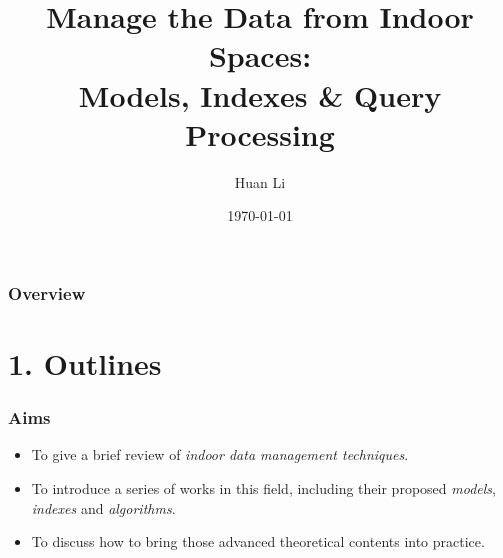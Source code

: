 \documentclass{beamer}
\title[Manage the Data from Indoor Spaces]{Manage the Data from Indoor Spaces: \\Models, Indexes \& Query Processing} %
\author{Huan Li} %
\institute[Zhejiang University] %
{
Database Laboratory, Zhejiang University \\ %
\medskip
\textit{lihuancs@zju.edu.cn} %
}
\date{\today} %
\begin{document}
\begin{frame}
\titlepage %
\end{frame}

\begin{frame}
\frametitle{Overview} %
\setcounter{tocdepth}{1}
\tableofcontents %
\end{frame}

\AtBeginSection[]
{
    \begin{frame}[shrink]
        \tableofcontents[sectionstyle=show/shaded,subsectionstyle=show/shaded/hide]
    \end{frame}
}


\section{1. Outlines} %


\begin{frame}
\frametitle{Aims}
\begin{itemize}
\item To give a brief review of \emph{indoor data management techniques}.
\item To introduce a series of works in this field, including their proposed \emph{models}, \emph{indexes} and \emph{algorithms}.
\item To discuss how to bring those advanced theoretical contents into practice.
\end{itemize}
\end{frame}
\end{document}
